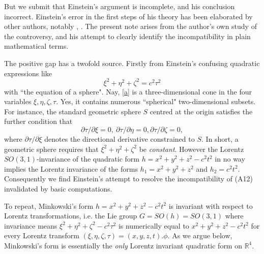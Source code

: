 \documentclass[12pt]{amsart}
\theoremstyle{definition}
\theoremstyle{remark}
\newcommand{\bR}{\mathbb{R}}
\newcommand{\del}{\partial}
\begin{document}
But we submit that Einstein's argument is incomplete, and his conclusion incorrect. Einstein's error in the first steps of his theory has been elaborated by other authors, notably \cite{bryant}, \cite{crothers}. The present note arises from the author's own study of the controversy, and his attempt to clearly identify the incompatibility in plain mathematical terms. 

The positive gap has a twofold source. Firstly from Einstein's confusing quadratic expressions like \begin{equation}\label{a}\xi^2+\eta^2+\zeta^2=c^2 \tau^2
\end{equation} with ``the equation of a sphere". Nay, \eqref{a} is a three-dimensional cone in the four variables $\xi, \eta, \zeta, \tau$. Yes, it contains numerous ``spherical" two-dimensional subsets. For instance, the standard geometric sphere $S$ centred at the origin satisfies the further condition that $$\del \tau / \del \xi=0, ~ \del \tau / \del \eta=0, \del \tau / \del \zeta=0,$$ where $\del \tau / \del \xi$ denotes the directional derivative constrained to $S$. In short, a geometric sphere requires that $\xi^2+\eta^2+\zeta^2$ be \emph{constant}. However the Lorentz $SO(3,1)$-invariance of the quadratic form $h=x^2+y^2+z^2-c^2t^2$ in no way implies the Lorentz invariance of the forms $h_1=x^2+y^2+z^2$ and $h_2=c^2 t^2.$ Consequently we find Einstein's attempt to resolve the incompatibility of (A12) invalidated by basic computations. 


To repeat, Minkowski's form $h=x^2+y^2+z^2-c^2t^2$ is invariant with respect to Lorentz transformations, i.e. the Lie group $G=SO(h)=SO(3,1)$ where invariance means $\xi^2+\eta^2+\zeta^2-c^2 \tau^2$ is numerically equal to $x^2+y^2+z^2-c^2 t^2$ for every Lorentz transform $(\xi, \eta, \zeta, \tau)=(x,y,z,t).\phi$. As we argue below, Minkowski's form is essentially the \emph{only} Lorentz invariant quadratic form on $\bR^4$. 
\end{document}
